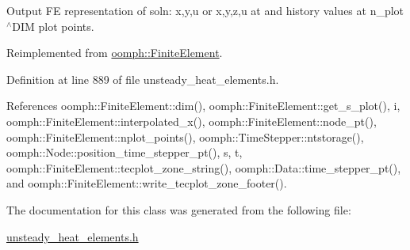 Output FE representation of soln\+: x,y,u or x,y,z,u at and history values at n\+\_\+plot$^\wedge$\+D\+IM plot points. 



Reimplemented from \hyperlink{classoomph_1_1FiniteElement_afa9d9b2670f999b43e6679c9dd28c457}{oomph\+::\+Finite\+Element}.



Definition at line 889 of file unsteady\+\_\+heat\+\_\+elements.\+h.



References oomph\+::\+Finite\+Element\+::dim(), oomph\+::\+Finite\+Element\+::get\+\_\+s\+\_\+plot(), i, oomph\+::\+Finite\+Element\+::interpolated\+\_\+x(), oomph\+::\+Finite\+Element\+::node\+\_\+pt(), oomph\+::\+Finite\+Element\+::nplot\+\_\+points(), oomph\+::\+Time\+Stepper\+::ntstorage(), oomph\+::\+Node\+::position\+\_\+time\+\_\+stepper\+\_\+pt(), s, t, oomph\+::\+Finite\+Element\+::tecplot\+\_\+zone\+\_\+string(), oomph\+::\+Data\+::time\+\_\+stepper\+\_\+pt(), and oomph\+::\+Finite\+Element\+::write\+\_\+tecplot\+\_\+zone\+\_\+footer().



The documentation for this class was generated from the following file\+:\begin{DoxyCompactItemize}
\item 
\hyperlink{unsteady__heat__elements_8h}{unsteady\+\_\+heat\+\_\+elements.\+h}\end{DoxyCompactItemize}
